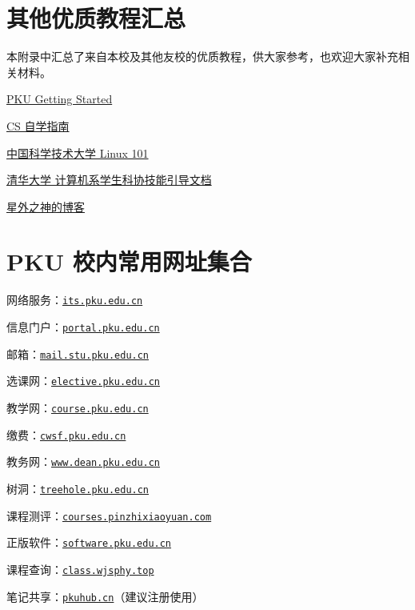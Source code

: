 \documentclass[../main]{subfiles}
\begin{document}
\chapter{其他优质教程汇总}

本附录中汇总了来自本校及其他友校的优质教程，供大家参考，也欢迎大家补充相关材料。

\href{https://missing.lcpu.dev}{PKU Getting Started}

\href{https://csdiy.wiki/}{CS 自学指南}

\href{https://101.lug.ustc.edu.cn/}{中国科学技术大学 Linux 101}

\href{https://docs.net9.org/}{清华大学 计算机系学生科协技能引导文档}

\href{https://wszqkzqk.github.io/tags}{星外之神的博客}

\chapter{PKU 校内常用网址集合}

网络服务：\href{its.pku.edu.cn}{\texttt{its.pku.edu.cn}}

信息门户：\href{portal.pku.edu.cn}{\texttt{portal.pku.edu.cn}}

邮箱：\href{mail.stu.pku.edu.cn}{\texttt{mail.stu.pku.edu.cn}}

选课网：\href{elective.pku.edu.cn}{\texttt{elective.pku.edu.cn}}

教学网：\href{course.pku.edu.cn}{\texttt{course.pku.edu.cn}}

缴费：\href{cwsf.pku.edu.cn}{\texttt{cwsf.pku.edu.cn}}

教务网：\href{www.dean.pku.edu.cn}{\texttt{www.dean.pku.edu.cn}}

树洞：\href{treehole.pku.edu.cn}{\texttt{treehole.pku.edu.cn}}

课程测评：\href{courses.pinzhixiaoyuan.com}{\texttt{courses.pinzhixiaoyuan.com}}

正版软件：\href{software.pku.edu.cn}{\texttt{software.pku.edu.cn}}

课程查询：\href{https://class.wjsphy.top/}{\texttt{class.wjsphy.top}}

笔记共享：\href{https://pkuhub.cn/}{\texttt{pkuhub.cn}}（建议注册使用）
\end{document}
